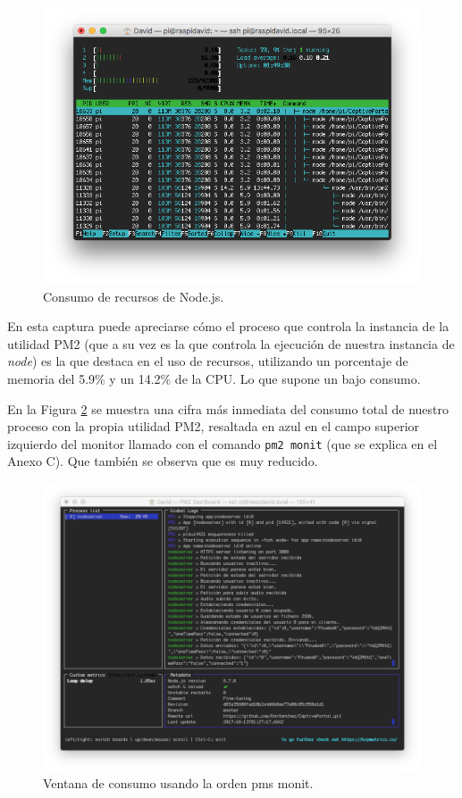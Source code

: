 \begin{figure}[!t]
\begin{center}
\includegraphics[width=0.75\linewidth]{./6_EvalEmpirica/Img/htopNode.png}
\end{center}
\caption{Consumo de recursos de Node.js.}
\label{htopNode}
\end{figure}

En esta captura puede apreciarse cómo el proceso que controla la instancia de la utilidad PM2 (que a su vez es la que controla la ejecución de nuestra instancia de \emph{node}) es la que destaca en el uso de recursos, utilizando un porcentaje de memoria del 5.9\% y un 14.2\% de la CPU. Lo que supone un bajo consumo.

En la Figura \ref{pm2monitNode} se muestra una cifra más inmediata del consumo total de nuestro proceso con la propia utilidad PM2, resaltada en azul en el campo superior izquierdo del monitor llamado con el comando \verb+pm2 monit+ (que se explica en el Anexo C). Que también se observa que es muy reducido.

\begin{figure}[!t]
\begin{center}
\includegraphics[width=0.75\linewidth]{./6_EvalEmpirica/Img/pm2monitNode.png}
\end{center}
\caption{Ventana de consumo usando la orden pms monit.}
\label{pm2monitNode}
\end{figure}

